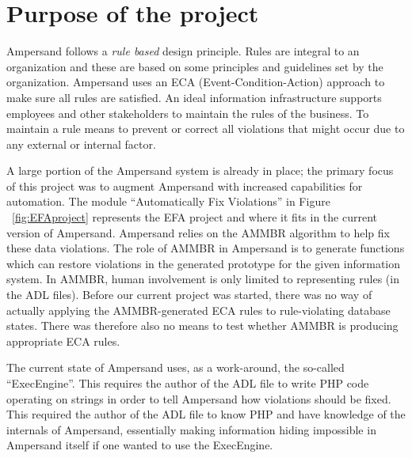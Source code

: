 %

\section{Purpose of the project}

Ampersand follows a \emph{rule based} design principle. Rules are integral to an organization
and these are based on some principles and guidelines set by the organization.
Ampersand uses an ECA (Event-Condition-Action) approach to make sure all rules are satisfied. An ideal information infrastructure supports employees and other stakeholders to maintain the rules of the business. To maintain a rule means to prevent or correct all violations that might occur due to any external or internal factor.
 
 A large portion of the Ampersand system is already in place; the primary focus of this project was to
augment Ampersand with increased capabilities for automation. The module ``Automatically Fix Violations'' in Figure ~\ref{fig:EFAproject} represents the EFA project and where it fits in the current version of Ampersand.
Ampersand relies on the AMMBR \citep{Ampersand} algorithm to help fix these data violations. 
The role 
of AMMBR in Ampersand is to generate functions which can restore violations
in the generated prototype for the given information system. In AMMBR, human involvement is only limited 
to representing rules (in the ADL files). Before our current project was started, there was no way of actually
applying the AMMBR-generated ECA rules to rule-violating database states.
There was therefore also no means to test whether AMMBR is producing
appropriate ECA rules.

The current state of Ampersand uses, as a work-around, the so-called
``ExecEngine''. This requires the author of the ADL file 
to write PHP code operating on strings in order to tell Ampersand
how violations should be fixed. This required the author of the 
ADL file to know PHP and have knowledge of the internals of Ampersand,
essentially making information hiding impossible in Ampersand itself if one wanted to use
the ExecEngine. 
 
